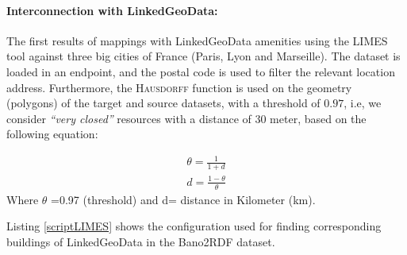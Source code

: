 \paragraph{Interconnection with LinkedGeoData:}
The first results of mappings with LinkedGeoData amenities using the LIMES tool against three big cities of France (Paris, Lyon and Marseille). The dataset is loaded in an endpoint, and the postal code is used to filter the relevant location address. Furthermore, the \textsc{Hausdorff} function is used on the geometry (polygons) of the target and source datasets, with a threshold of $0.97$, i.e, we consider \textit{``very closed''} resources with a distance of 30 meter, based on the following equation:  

\begin{align*}
\theta = \frac{1}{1+d} \\
 d	= \frac{1-\theta}{\theta}
\end{align*}
Where $\theta$ =0.97 (threshold) and d= distance in Kilometer (km).

Listing \ref{scriptLIMES} shows the configuration used for finding corresponding buildings of LinkedGeoData in the Bano2RDF dataset.

